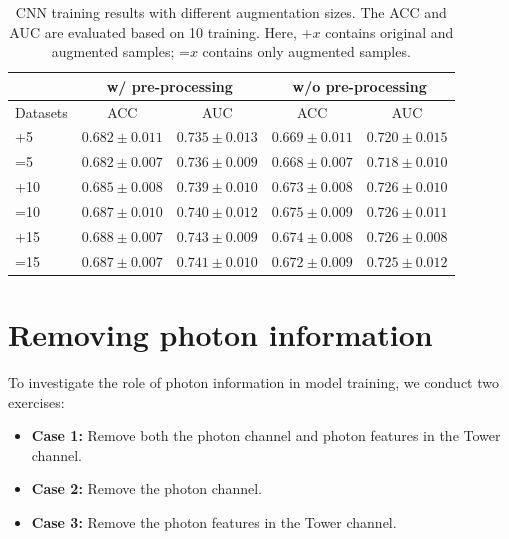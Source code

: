 \documentclass[12pt]{article}
\begin{document}
        \begin{table}[htpb]
            \centering
            \caption{CNN training results with different augmentation sizes. The ACC and AUC are evaluated based on 10 training. Here, +$x$ contains original and augmented samples; =$x$ contains only augmented samples.}
            \label{tab:CWoLa_CNN_training_results_3000_jet_tagging_phi_only_aug_5_10_15_w_wo_preprocess}
            \begin{tabular}{l|cc|cc}
                         & \multicolumn{2}{c|}{w/ pre-processing}      & \multicolumn{2}{c}{w/o pre-processing}           \\ \hline
                Datasets & ACC               & AUC               & ACC               & AUC               \\ \hline
                +5       & $0.682 \pm 0.011$ & $0.735 \pm 0.013$ & $0.669 \pm 0.011$ & $0.720 \pm 0.015$ \\
                =5       & $0.682 \pm 0.007$ & $0.736 \pm 0.009$ & $0.668 \pm 0.007$ & $0.718 \pm 0.010$ \\
                +10      & $0.685 \pm 0.008$ & $0.739 \pm 0.010$ & $0.673 \pm 0.008$ & $0.726 \pm 0.010$ \\
                =10      & $0.687 \pm 0.010$ & $0.740 \pm 0.012$ & $0.675 \pm 0.009$ & $0.726 \pm 0.011$ \\
                +15      & $0.688 \pm 0.007$ & $0.743 \pm 0.009$ & $0.674 \pm 0.008$ & $0.726 \pm 0.008$ \\
                =15      & $0.687 \pm 0.007$ & $0.741 \pm 0.010$ & $0.672 \pm 0.009$ & $0.725 \pm 0.012$
            \end{tabular}
        \end{table}
\section{Removing photon information}%
\label{sec:removing_photon_information}
    To investigate the role of photon information in model training, we conduct two exercises:
    \begin{itemize}
        \item \textbf{Case 1:} Remove both the photon channel and photon features in the Tower channel.
        \item \textbf{Case 2:} Remove the photon channel.
        \item \textbf{Case 3:} Remove the photon features in the Tower channel.
    \end{itemize}
\end{document}
